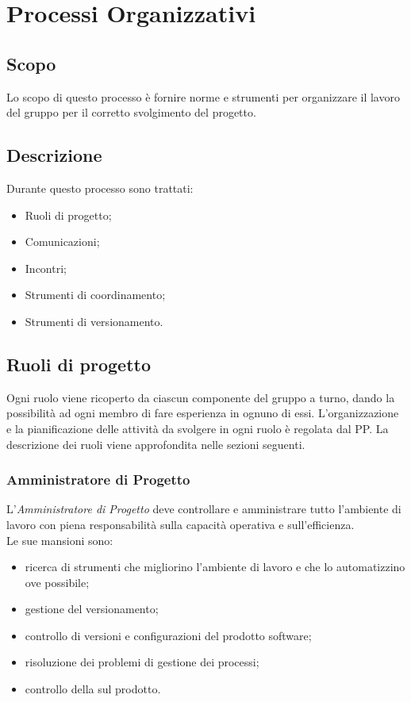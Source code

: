 \documentclass[../NormediProgetto.tex]{subfiles}
\begin{document}
	
	\chapter{Processi Organizzativi}
	
	\section{Scopo}
	Lo scopo di questo processo è fornire norme e strumenti per organizzare il lavoro del gruppo per il corretto svolgimento del progetto.
	
	\section {Descrizione}
	Durante questo processo sono trattati:
	\begin{itemize}
		\item Ruoli di progetto;
		\item Comunicazioni;
		\item Incontri;
		\item Strumenti di coordinamento;
		\item Strumenti di versionamento.
		
	\end{itemize}
	
	\section {Ruoli di progetto}
	
	Ogni ruolo viene ricoperto da ciascun componente del gruppo a turno, dando la possibilità ad ogni membro di fare esperienza in ognuno di essi. L'organizzazione e la pianificazione delle attività da svolgere in ogni ruolo è regolata dal PP. La descrizione dei ruoli viene approfondita nelle sezioni seguenti.
	
	\subsection {Amministratore di Progetto}
	
	L’\textit{Amministratore di Progetto} deve controllare e amministrare tutto l’ambiente di lavoro con piena responsabilità sulla capacità operativa e sull’efficienza. 
	\\ \noindent Le sue mansioni sono: 
	
	\begin{itemize}
		\item ricerca di strumenti che migliorino l’ambiente di lavoro e che lo automatizzino ove possibile;
		\item gestione del versionamento;
		\item controllo di versioni e configurazioni del prodotto software; 
		\item risoluzione dei problemi di gestione dei processi; 
		\item controllo della  sul prodotto.
	\end{itemize}
	
\end{document}
